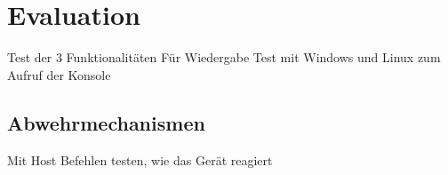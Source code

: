 \chapter{Evaluation}
Test der 3 Funktionalitäten
Für Wiedergabe Test mit Windows und Linux zum Aufruf der Konsole

\section{Abwehrmechanismen}
Mit Host Befehlen testen, wie das Gerät reagiert \cite{mihailowitsch}